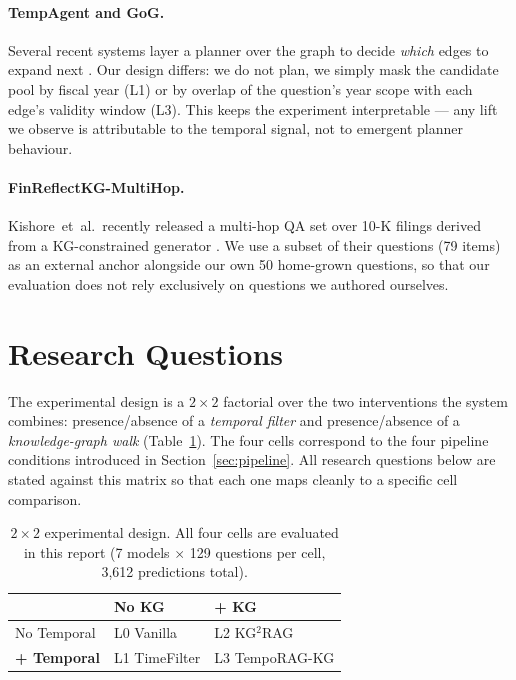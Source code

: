 \documentclass[11pt]{article}
\newcommand{\cmark}{\ding{51}}
\begin{document}
\paragraph{TempAgent and GoG.}
Several recent systems layer a planner over the graph to decide
\emph{which} edges to expand next \citep{tempagent2025,he2024gog}. Our
design differs: we do not plan, we simply mask the candidate pool by
fiscal year (L1) or by overlap of the question's year scope with each
edge's validity window (L3). This keeps the experiment interpretable ---
any lift we observe is attributable to the temporal signal, not to
emergent planner behaviour.

\paragraph{FinReflectKG-MultiHop.}
Kishore~et~al.\ recently released a multi-hop QA set over 10-K filings
derived from a KG-constrained generator \citep{finreflectkg2025}. We use
a subset of their questions (79 items) as an external anchor alongside
our own 50 home-grown questions, so that our evaluation does not rely
exclusively on questions we authored ourselves.

\section{Research Questions}
\label{sec:rqs}

The experimental design is a $2\times2$ factorial over the two
interventions the system combines: presence/absence of a \emph{temporal
filter} and presence/absence of a \emph{knowledge-graph walk}
(Table~\ref{tab:2x2}). The four cells correspond to the four pipeline
conditions introduced in Section~\ref{sec:pipeline}. All research
questions below are stated against this matrix so that each one maps
cleanly to a specific cell comparison.

\begin{table}[h]
\centering
\small
\setlength{\tabcolsep}{4pt}
\begin{tabular}{@{}lll@{}}
\toprule
            & No KG                   & \textbf{+ KG}            \\
\midrule
No Temporal & L0 Vanilla \cmark       & L2 KG$^{2}$RAG \cmark    \\
\textbf{+ Temporal} & L1 TimeFilter \cmark & L3 TempoRAG-KG \cmark \\
\bottomrule
\end{tabular}
\caption{$2\times2$ experimental design. All four cells are evaluated
in this report (7 models $\times$ 129 questions per cell, 3{,}612
predictions total).}
\label{tab:2x2}
\end{table}
\end{document}
